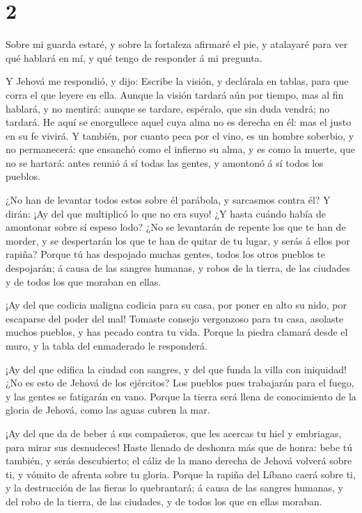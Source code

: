 \hypertarget{section-1}{%
\section{2}\label{section-1}}

 Sobre mi guarda estaré, y sobre la fortaleza afirmaré el
pie, y atalayaré para ver qué hablará en mí, y qué tengo de responder á
mi pregunta.

 Y Jehová me respondió, y dijo: Escribe la visión, y
declárala en tablas, para que corra el que leyere en ella. 
Aunque la visión tardará aún por tiempo, mas al fin hablará, y no
mentirá: aunque se tardare, espéralo, que sin duda vendrá; no tardará.
 He aquí se enorgullece aquel cuya alma no es derecha en él:
mas el justo en su fe vivirá.  Y también, por cuanto peca
por el vino, es un hombre soberbio, y no permanecerá: que ensanchó como
el infierno su alma, y es como la muerte, que no se hartará: antes
reunió á sí todas las gentes, y amontonó á sí todos los pueblos.

 ¿No han de levantar todos estos sobre él parábola, y
sarcasmos contra él? Y dirán: ¡Ay del que multiplicó lo que no era suyo!
¿Y hasta cuándo había de amontonar sobre sí espeso lodo? 
¿No se levantarán de repente los que te han de morder, y se despertarán
los que te han de quitar de tu lugar, y serás á ellos por rapiña?
 Porque tú has despojado muchas gentes, todos los otros
pueblos te despojarán; á causa de las sangres humanas, y robos de la
tierra, de las ciudades y de todos los que moraban en ellas.

 ¡Ay del que codicia maligna codicia para su casa, por poner
en alto su nido, por escaparse del poder del mal!  Tomaste
consejo vergonzoso para tu casa, asolaste muchos pueblos, y has pecado
contra tu vida.  Porque la piedra clamará desde el muro, y
la tabla del enmaderado le responderá.

 ¡Ay del que edifica la ciudad con sangres, y del que funda
la villa con iniquidad!  ¿No es esto de Jehová de los
ejércitos? Los pueblos pues trabajarán para el fuego, y las gentes se
fatigarán en vano.  Porque la tierra será llena de
conocimiento de la gloria de Jehová, como las aguas cubren la mar.

 ¡Ay del que da de beber á sus compañeros, que les acercas
tu hiel y embriagas, para mirar sus desnudeces!  Haste
llenado de deshonra más que de honra: bebe tú también, y serás
descubierto; el cáliz de la mano derecha de Jehová volverá sobre ti, y
vómito de afrenta sobre tu gloria.  Porque la rapiña del
Líbano caerá sobre ti, y la destrucción de las fieras lo quebrantará; á
causa de las sangres humanas, y del robo de la tierra, de las ciudades,
y de todos los que en ellas moraban.

